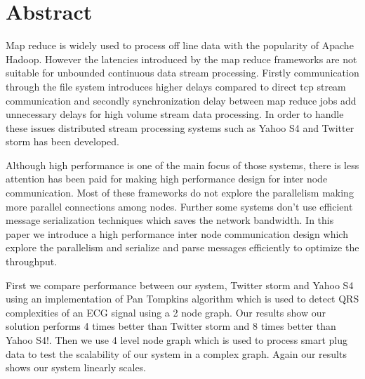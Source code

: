 \section{Abstract}
Map reduce is widely used to process off line data with the popularity of Apache Hadoop. However the latencies introduced by the map reduce frameworks are not suitable for unbounded continuous data stream processing. Firstly communication through the file system introduces higher delays compared to direct tcp stream communication and secondly synchronization delay between map reduce jobs add unnecessary delays for high volume stream data processing. In order to handle these issues  distributed stream processing systems such as Yahoo S4 and Twitter storm has been developed. 


Although high performance is one of the main focus of those systems, there is less attention has been paid for making high performance design for inter node communication. Most of these frameworks do not explore the parallelism making more parallel connections among nodes. Further some systems don't use efficient message serialization techniques which saves the network bandwidth. In this paper we introduce a high performance inter node communication design which explore the parallelism and serialize and parse messages efficiently to optimize the throughput. 


First we compare performance between our system, Twitter storm and  Yahoo S4 using an implementation of Pan Tompkins algorithm which is used to detect QRS complexities of an ECG signal using a 2 node graph. Our results show our solution performs 4 times better than Twitter storm and 8 times better than Yahoo S4!. Then we use 4 level node graph which is used to process smart plug data to test the scalability of our system in a complex graph. Again our results shows our system linearly scales.
